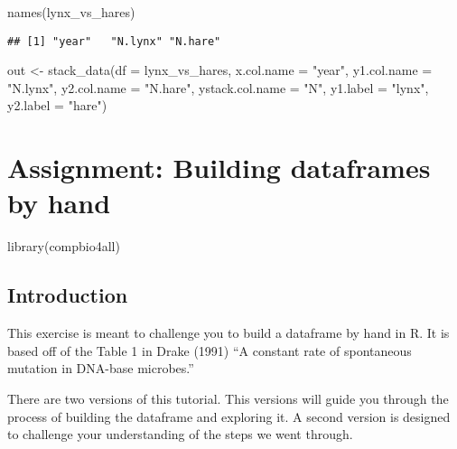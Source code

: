 \documentclass[
]{book}
\newenvironment{Shaded}{\begin{snugshade}}{\end{snugshade}}
\newcommand{\AttributeTok}[1]{\textcolor[rgb]{0.77,0.63,0.00}{#1}}
\newcommand{\FunctionTok}[1]{\textcolor[rgb]{0.00,0.00,0.00}{#1}}
\newcommand{\NormalTok}[1]{#1}
\newcommand{\OtherTok}[1]{\textcolor[rgb]{0.56,0.35,0.01}{#1}}
\newcommand{\StringTok}[1]{\textcolor[rgb]{0.31,0.60,0.02}{#1}}
\begin{document}
\begin{Shaded}
\begin{Highlighting}[]
\FunctionTok{names}\NormalTok{(lynx\_vs\_hares)}
\end{Highlighting}
\end{Shaded}

\begin{verbatim}
## [1] "year"   "N.lynx" "N.hare"
\end{verbatim}

\begin{Shaded}
\begin{Highlighting}[]
\NormalTok{out }\OtherTok{\textless{}{-}} \FunctionTok{stack\_data}\NormalTok{(}\AttributeTok{df =}\NormalTok{ lynx\_vs\_hares,}
           \AttributeTok{x.col.name =} \StringTok{"year"}\NormalTok{,}
           \AttributeTok{y1.col.name =} \StringTok{"N.lynx"}\NormalTok{,}
           \AttributeTok{y2.col.name =} \StringTok{"N.hare"}\NormalTok{,}
           \AttributeTok{ystack.col.name =} \StringTok{"N"}\NormalTok{,}
           \AttributeTok{y1.label =} \StringTok{"lynx"}\NormalTok{,}
           \AttributeTok{y2.label =} \StringTok{"hare"}\NormalTok{)}
\end{Highlighting}
\end{Shaded}

\hypertarget{assignment-building-dataframes-by-hand}{%
\chapter{Assignment: Building dataframes by hand}\label{assignment-building-dataframes-by-hand}}

\begin{Shaded}
\begin{Highlighting}[]
\FunctionTok{library}\NormalTok{(compbio4all)}
\end{Highlighting}
\end{Shaded}

\hypertarget{introduction-1}{%
\section{Introduction}\label{introduction-1}}

This exercise is meant to challenge you to build a dataframe by hand in R. It is based off of the Table 1 in Drake (1991) ``A constant rate of spontaneous mutation in DNA-base microbes.''

There are two versions of this tutorial. This versions will guide you through the process of building the dataframe and exploring it. A second version is designed to challenge your understanding of the steps we went through.
\end{document}

